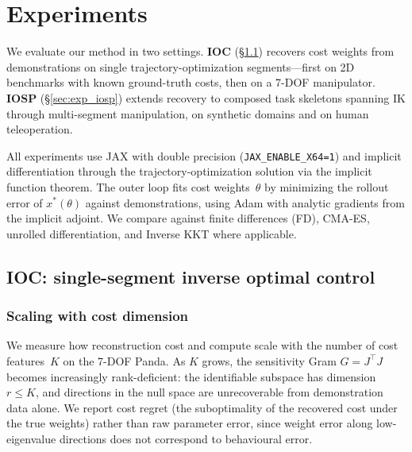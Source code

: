 
\section{Experiments}
\label{sec:experiments}

We evaluate our method in two settings. \textbf{IOC} (\S\ref{sec:exp_ioc}) recovers cost weights from demonstrations on single trajectory-optimization segments---first on 2D benchmarks with known ground-truth costs, then on a 7-DOF manipulator.
\textbf{IOSP} (\S\ref{sec:exp_iosp}) extends recovery to composed task skeletons spanning IK through multi-segment manipulation, on synthetic domains and on human teleoperation.

All experiments use JAX with double precision (\texttt{JAX\_ENABLE\_X64=1}) and implicit differentiation through the trajectory-optimization solution via the implicit function theorem. The outer loop fits cost weights~$\theta$ by minimizing the rollout error of $x^*(\theta)$ against demonstrations, using Adam with analytic gradients from the implicit adjoint. We compare against finite differences (FD), CMA-ES, unrolled differentiation, and Inverse KKT where applicable.

\subsection{IOC: single-segment inverse optimal control}
\label{sec:exp_ioc}

\subsubsection{Scaling with cost dimension}
\label{sec:exp_scaling}

We measure how reconstruction cost and compute scale with the number of cost features~$K$ on the 7-DOF Panda.
As $K$ grows, the sensitivity Gram $G = J^\top J$ becomes increasingly rank-deficient: the identifiable subspace has dimension~$r \leq K$, and directions in the null space are unrecoverable from demonstration data alone.
We report cost regret (the suboptimality of the recovered cost under the true weights) rather than raw parameter error, since weight error along low-eigenvalue directions does not correspond to behavioural error.

